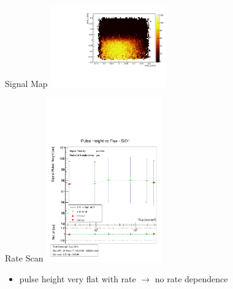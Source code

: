 \documentclass[9pt]{beamer}
\begin{document}
\begin{frame}
	\def \sp {5cm}
	\begin{minipage}{5.5cm}
		\centering
		Signal Map
		\includegraphics[angle=270, width=\sp]{SiD1SM}
	\end{minipage}
	\hspace*{2pt}
	\begin{minipage}{5.5cm}
		\centering
		Rate Scan
		\includegraphics[width=\sp]{CPH1608_18_1_2}
	\end{minipage}\s
	\begin{itemize}
		\item pulse height very flat with rate $\rightarrow$ no rate dependence
	\end{itemize}
\end{frame}
\end{document}
